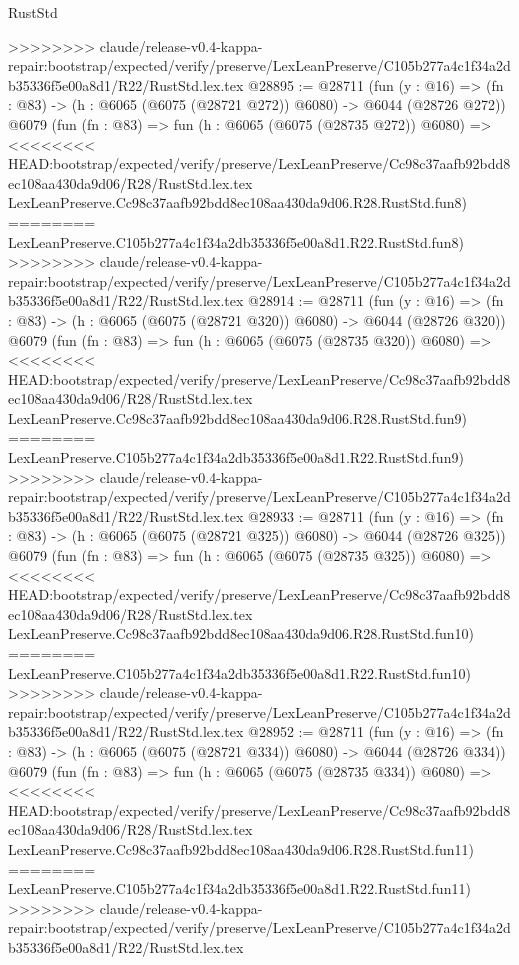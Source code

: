 \begin{lexlean}{RustStd}
\begin{coremodule}
{\begin{coremodule}
{{{{{{{{{{{{{{{{{{{{{{{{{{>>>>>>>> claude/release-v0.4-kappa-repair:bootstrap/expected/verify/preserve/LexLeanPreserve/C105b277a4c1f34a2db35336f5e00a8d1/R22/RustStd.lex.tex
@28895 := @28711
    (fun (y : @16) => (fn : @83) -> (h : @6065 (@6075 (@28721 @272)) @6080) -> @6044 (@28726 @272))
    @6079
    (fun (fn : @83) =>
    fun (h : @6065 (@6075 (@28735 @272)) @6080) =>
<<<<<<<< HEAD:bootstrap/expected/verify/preserve/LexLeanPreserve/Cc98c37aafb92bdd8ec108aa430da9d06/R28/RustStd.lex.tex
    LexLeanPreserve.Cc98c37aafb92bdd8ec108aa430da9d06.R28.RustStd.fun8)
========
    LexLeanPreserve.C105b277a4c1f34a2db35336f5e00a8d1.R22.RustStd.fun8)
>>>>>>>> claude/release-v0.4-kappa-repair:bootstrap/expected/verify/preserve/LexLeanPreserve/C105b277a4c1f34a2db35336f5e00a8d1/R22/RustStd.lex.tex
@28914 := @28711
    (fun (y : @16) => (fn : @83) -> (h : @6065 (@6075 (@28721 @320)) @6080) -> @6044 (@28726 @320))
    @6079
    (fun (fn : @83) =>
    fun (h : @6065 (@6075 (@28735 @320)) @6080) =>
<<<<<<<< HEAD:bootstrap/expected/verify/preserve/LexLeanPreserve/Cc98c37aafb92bdd8ec108aa430da9d06/R28/RustStd.lex.tex
    LexLeanPreserve.Cc98c37aafb92bdd8ec108aa430da9d06.R28.RustStd.fun9)
========
    LexLeanPreserve.C105b277a4c1f34a2db35336f5e00a8d1.R22.RustStd.fun9)
>>>>>>>> claude/release-v0.4-kappa-repair:bootstrap/expected/verify/preserve/LexLeanPreserve/C105b277a4c1f34a2db35336f5e00a8d1/R22/RustStd.lex.tex
@28933 := @28711
    (fun (y : @16) => (fn : @83) -> (h : @6065 (@6075 (@28721 @325)) @6080) -> @6044 (@28726 @325))
    @6079
    (fun (fn : @83) =>
    fun (h : @6065 (@6075 (@28735 @325)) @6080) =>
<<<<<<<< HEAD:bootstrap/expected/verify/preserve/LexLeanPreserve/Cc98c37aafb92bdd8ec108aa430da9d06/R28/RustStd.lex.tex
    LexLeanPreserve.Cc98c37aafb92bdd8ec108aa430da9d06.R28.RustStd.fun10)
========
    LexLeanPreserve.C105b277a4c1f34a2db35336f5e00a8d1.R22.RustStd.fun10)
>>>>>>>> claude/release-v0.4-kappa-repair:bootstrap/expected/verify/preserve/LexLeanPreserve/C105b277a4c1f34a2db35336f5e00a8d1/R22/RustStd.lex.tex
@28952 := @28711
    (fun (y : @16) => (fn : @83) -> (h : @6065 (@6075 (@28721 @334)) @6080) -> @6044 (@28726 @334))
    @6079
    (fun (fn : @83) =>
    fun (h : @6065 (@6075 (@28735 @334)) @6080) =>
<<<<<<<< HEAD:bootstrap/expected/verify/preserve/LexLeanPreserve/Cc98c37aafb92bdd8ec108aa430da9d06/R28/RustStd.lex.tex
    LexLeanPreserve.Cc98c37aafb92bdd8ec108aa430da9d06.R28.RustStd.fun11)
========
    LexLeanPreserve.C105b277a4c1f34a2db35336f5e00a8d1.R22.RustStd.fun11)
>>>>>>>> claude/release-v0.4-kappa-repair:bootstrap/expected/verify/preserve/LexLeanPreserve/C105b277a4c1f34a2db35336f5e00a8d1/R22/RustStd.lex.tex
}}}}}}}}}}}}}}}}}}}}}}}}}}
\end{coremodule}}
\end{coremodule}
\end{lexlean}
